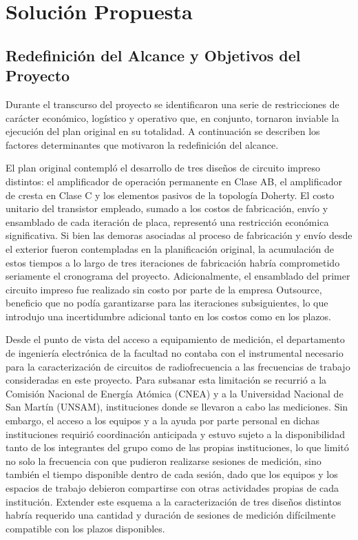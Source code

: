\newpage
\section{Solución Propuesta} \label{sec:solucion_propuesta}

\subsection{Redefinición del Alcance y Objetivos del Proyecto}
Durante el transcurso del proyecto se identificaron una serie de restricciones de carácter económico, logístico y operativo que, en conjunto, tornaron inviable la ejecución del plan original en su totalidad. A continuación se describen los factores determinantes que motivaron la redefinición del alcance.

El plan original contempló el desarrollo de tres diseños de circuito impreso distintos: el amplificador de operación permanente en Clase AB, el amplificador de cresta en Clase C y los elementos pasivos de la topología Doherty. El costo unitario del transistor empleado, sumado a los costos de fabricación, envío y ensamblado de cada iteración de placa, representó una restricción económica significativa. Si bien las demoras asociadas al proceso de fabricación y envío desde el exterior fueron contempladas en la planificación original, la acumulación de estos tiempos a lo largo de tres iteraciones de fabricación habría comprometido seriamente el cronograma del proyecto. Adicionalmente, el ensamblado del primer circuito impreso fue realizado sin costo por parte de la empresa Outsource, beneficio que no podía garantizarse para las iteraciones subsiguientes, lo que introdujo una incertidumbre adicional tanto en los costos como en los plazos.

Desde el punto de vista del acceso a equipamiento de medición, el departamento de ingeniería electrónica de la facultad no contaba con el instrumental necesario para la caracterización de circuitos de radiofrecuencia a las frecuencias de trabajo consideradas en este proyecto. Para subsanar esta limitación se recurrió a la Comisión Nacional de Energía Atómica (CNEA) y a la Universidad Nacional de San Martín (UNSAM), instituciones donde se llevaron a cabo las mediciones. Sin embargo, el acceso a los equipos y a la ayuda por parte personal en dichas instituciones requirió coordinación anticipada y estuvo sujeto a la disponibilidad tanto de los integrantes del grupo como de las propias instituciones, lo que limitó no solo la frecuencia con que pudieron realizarse sesiones de medición, sino también el tiempo disponible dentro de cada sesión, dado que los equipos y los espacios de trabajo debieron compartirse con otras actividades propias de cada institución. Extender este esquema a la caracterización de tres diseños distintos habría requerido una cantidad y duración de sesiones de medición difícilmente compatible con los plazos disponibles.

